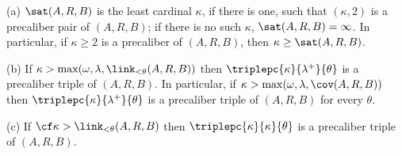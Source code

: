 (a) $\sat(A,R,B)$ is the least cardinal $\kappa$, if there is one, such
that $(\kappa,2)$ is a precaliber pair of $(A,R,B)$;  if there is no
such $\kappa$, $\sat(A,R,B)=\infty$.   In particular, if $\kappa\ge 2$
is a precaliber of $(A,R,B)$, then $\kappa\ge\sat(A,R,B)$.

(b) If $\kappa>\max(\omega,\lambda,\link_{<\theta}(A,R,B))$ then
$\triplepc{\kappa}{\lambda^+}{\theta}$ is a precaliber triple of
$(A,R,B)$.   In particular, if
$\kappa>\max(\omega,\lambda,\cov(A,R,B))$ then
$\triplepc{\kappa}{\lambda^+}{\theta}$ is a precaliber triple of
$(A,R,B)$ for every $\theta$.

(c) If $\cf\kappa>\link_{<\theta}(A,R,B)$ then
$\triplepc{\kappa}{\kappa}{\theta}$ is a precaliber triple of $(A,R,B)$.

